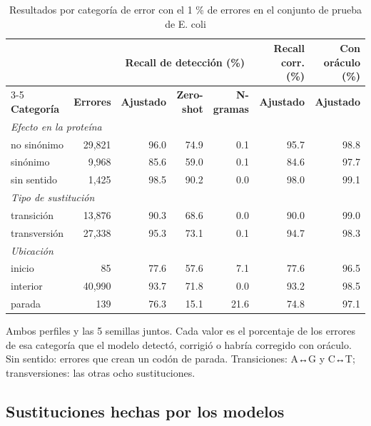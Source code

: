 \documentclass[sigconf,nonacm]{acmart}
\begin{document}
\begin{table}[t]
\caption{Resultados por categoría de error con el 1 \% de errores en el conjunto de prueba de E. coli}
\label{tab:categorias}
\small
\begin{tabular}{lrrrrrr}
\toprule
 & & \multicolumn{3}{c}{\textbf{Recall de detección (\%)}} & \textbf{Recall corr. (\%)} & \textbf{Con oráculo (\%)} \\
\cmidrule(lr){3-5}
\textbf{Categoría} & \textbf{Errores} & \textbf{Ajustado} & \textbf{Zero-shot} & \textbf{N-gramas} & \textbf{Ajustado} & \textbf{Ajustado} \\
\midrule
\multicolumn{7}{l}{\emph{Efecto en la proteína}} \\
no sinónimo & 29,821 & 96.0 & 74.9 & 0.1 & 95.7 & 98.8 \\
sinónimo & 9,968 & 85.6 & 59.0 & 0.1 & 84.6 & 97.7 \\
sin sentido & 1,425 & 98.5 & 90.2 & 0.0 & 98.0 & 99.1 \\
\midrule
\multicolumn{7}{l}{\emph{Tipo de sustitución}} \\
transición & 13,876 & 90.3 & 68.6 & 0.0 & 90.0 & 99.0 \\
transversión & 27,338 & 95.3 & 73.1 & 0.1 & 94.7 & 98.3 \\
\midrule
\multicolumn{7}{l}{\emph{Ubicación}} \\
inicio & 85 & 77.6 & 57.6 & 7.1 & 77.6 & 96.5 \\
interior & 40,990 & 93.7 & 71.8 & 0.0 & 93.2 & 98.5 \\
parada & 139 & 76.3 & 15.1 & 21.6 & 74.8 & 97.1 \\
\bottomrule
\end{tabular}

\vspace{2pt}\begin{minipage}{\textwidth}\footnotesize Ambos perfiles y las 5 semillas juntos. Cada valor es el porcentaje de los errores de esa categoría que el modelo detectó, corrigió o habría corregido con oráculo. Sin sentido: errores que crean un codón de parada. Transiciones: A↔G y C↔T; transversiones: las otras ocho sustituciones.\end{minipage}
\end{table}

\subsection{Sustituciones hechas por los modelos}\label{sec:res-sustituciones}
\end{document}
